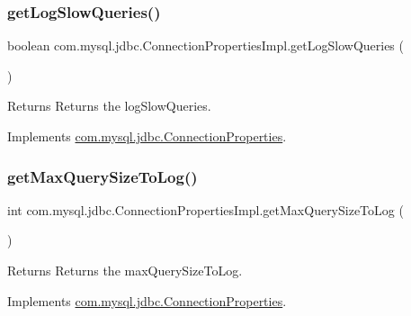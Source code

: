 \subsubsection{\texorpdfstring{get\+Log\+Slow\+Queries()}{getLogSlowQueries()}}
{\footnotesize\ttfamily boolean com.\+mysql.\+jdbc.\+Connection\+Properties\+Impl.\+get\+Log\+Slow\+Queries (\begin{DoxyParamCaption}{ }\end{DoxyParamCaption})}

\begin{DoxyReturn}{Returns}
Returns the log\+Slow\+Queries. 
\end{DoxyReturn}


Implements \mbox{\hyperlink{interfacecom_1_1mysql_1_1jdbc_1_1_connection_properties_a82c72191f1132e06d2bbe504acde3399}{com.\+mysql.\+jdbc.\+Connection\+Properties}}.

\mbox{\label{classcom_1_1mysql_1_1jdbc_1_1_connection_properties_impl_af533f73f3b344a7b3b50e647bb90563d}} 
\subsubsection{\texorpdfstring{get\+Max\+Query\+Size\+To\+Log()}{getMaxQuerySizeToLog()}}
{\footnotesize\ttfamily int com.\+mysql.\+jdbc.\+Connection\+Properties\+Impl.\+get\+Max\+Query\+Size\+To\+Log (\begin{DoxyParamCaption}{ }\end{DoxyParamCaption})}

\begin{DoxyReturn}{Returns}
Returns the max\+Query\+Size\+To\+Log. 
\end{DoxyReturn}


Implements \mbox{\hyperlink{interfacecom_1_1mysql_1_1jdbc_1_1_connection_properties_a55edac0ea8c39a11c087948106b3527c}{com.\+mysql.\+jdbc.\+Connection\+Properties}}.

\mbox{\label{classcom_1_1mysql_1_1jdbc_1_1_connection_properties_impl_a00b9680cb788678725baa239019bc714}} 

